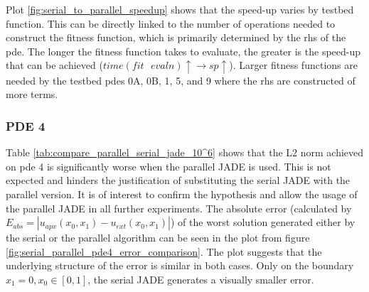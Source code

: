\documentclass[./\jobname.tex]{subfiles}
\begin{document}
Plot \ref{fig:serial_to_parallel_speedup} shows that the speed-up varies by testbed function. This can be directly linked to the number of operations needed to construct the fitness function, which is primarily determined by the \gls{rhs} of the \gls{pde}. The longer the fitness function takes to evaluate, the greater is the speed-up that can be achieved ($time(fit \text{ } evaln) \uparrow \rightarrow sp \uparrow$). Larger fitness functions are needed by the testbed \gls{pde}s 0A, 0B, 1, 5, and 9 where the \gls{rhs} are constructed of more terms.

\subsubsection{PDE 4}
Table \ref{tab:compare_parallel_serial_jade_10^6} shows that the L2 norm achieved on \gls{pde} 4 is significantly worse when the parallel JADE is used. This is not expected and hinders the justification of substituting the serial JADE with the parallel version. It is of interest to confirm the hypothesis and allow the usage of the parallel JADE in all further experiments. The absolute error (calculated by $E_{abs} = \left| u_{apx}(x_0, x_1) - u_{ext}(x_0, x_1) \right|$) of the worst solution generated either by the serial or the parallel algorithm can be seen in the plot from figure \ref{fig:serial_parallel_pde4_error_comparison}. The plot suggests that the underlying structure of the error is similar in both cases. Only on the boundary $x_1 = 0, x_0 \in [0,1]$, the serial JADE generates a visually smaller error. 
\end{document}
